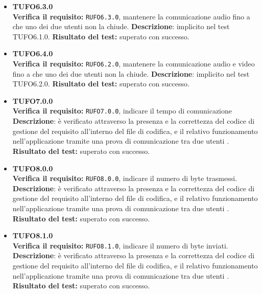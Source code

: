 \begin{itemize}
\item \textbf{TUFO6.3.0}\\
\textbf{Verifica il requisito:} \texttt{RUFO6.3.0}, mantenere la comunicazione audio fino a che uno dei due utenti non la chiude.
\textbf{Descrizione}: implicito nel test TUFO6.1.0.
\textbf{Risultato del test:} superato con successo.

\item \textbf{TUFO6.4.0}\\
\textbf{Verifica il requisito:} \texttt{RUFO6.2.0}, mantenere la comunicazione audio e video fino a che uno dei due utenti non la chiude.
\textbf{Descrizione}: implicito nel test TUFO6.2.0.
\textbf{Risultato del test:} superato con successo.

\item \textbf{TUFO7.0.0}\\
\textbf{Verifica il requisito:} \texttt{RUFO7.0.0}, indicare il tempo di comunicazione\\
\textbf{Descrizione}: è verificato attraverso la presenza e la correttezza del codice di gestione del requisito all'interno del file di codifica, e il relativo funzionamento nell'applicazione tramite una prova di comunicazione tra due utenti .\\
\textbf{Risultato del test:} superato con successo.

\item \textbf{TUFO8.0.0}\\
\textbf{Verifica il requisito:} \texttt{RUFO8.0.0}, indicare il numero di byte trasmessi.\\
\textbf{Descrizione}: è verificato attraverso la presenza e la correttezza del codice di gestione del requisito all'interno del file di codifica, e il relativo funzionamento nell'applicazione tramite una prova di comunicazione tra due utenti .\\
\textbf{Risultato del test:} superato con successo.

\item \textbf{TUFO8.1.0}\\
\textbf{Verifica il requisito:} \texttt{RUFO8.1.0}, indicare il numero di byte inviati.\\
\textbf{Descrizione}: è verificato attraverso la presenza e la correttezza del codice di gestione del requisito all'interno del file di codifica, e il relativo funzionamento nell'applicazione tramite una prova di comunicazione tra due utenti .\\
\textbf{Risultato del test:} superato con successo.


\end{itemize}
